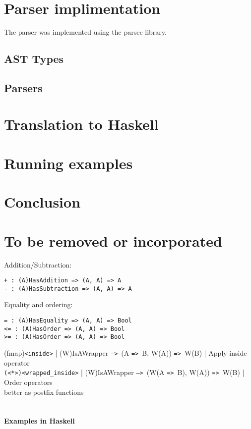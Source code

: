 \documentclass{article}
\def\H{Haskell}
\def\ra{\texttt{=>}\ }
\def\Ra{\texttt{-->}\ }
\begin{document}
\section{Parser implimentation}

The parser was implemented using the parsec library.

\subsection{AST Types}

\subsection{Parsers}

\section{Translation to \H}
\section{Running examples}
\section{Conclusion}

\section{To be removed or incorporated}

Addition/Subtraction:
\begin{verbatim}
+ : (A)HasAddition => (A, A) => A
- : (A)HasSubtraction => (A, A) => A
\end{verbatim}
Equality and ordering:
\begin{verbatim}
= : (A)HasEquality => (A, A) => Bool
<= : (A)HasOrder => (A, A) => Bool
>= : (A)HasOrder => (A, A) => Bool
\end{verbatim}

(fmap)\texttt{<inside>} | (W)IsAWrapper \Ra (A \ra B, W(A)) \ra W(B) | Apply inside operator \\
\texttt{(<*>)<wrapped_inside>} | (W)IsAWrapper \Ra (W(A \ra B), W(A)) \ra W(B) | Order operators \\

better as postfix functions \\
\hspace{1cm}\\
\paragraph{Examples in \H}
\end{document}
